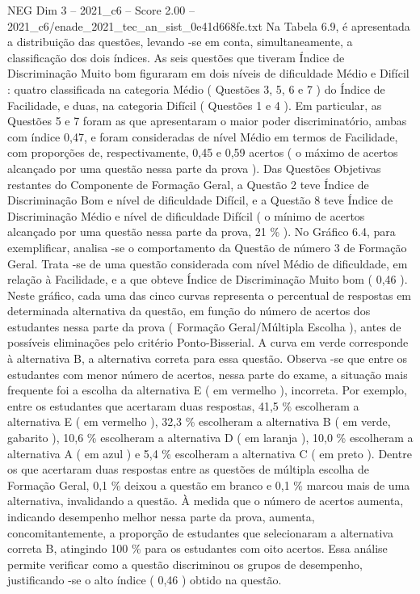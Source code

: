 \begin{textsample}{NEG Dim 3 – 2021\_c6 – Score 2.00 – 2021\_c6/enade\_2021\_tec\_an\_sist\_0e41d668fe.txt}
Na Tabela 6.9, é apresentada a distribuição das questões, levando -se em conta, simultaneamente, a classificação dos dois índices.
As seis questões que tiveram Índice de Discriminação Muito bom figuraram em dois níveis de dificuldade Médio e Difícil : quatro classificada na categoria Médio ( Questões 3, 5, 6 e 7 ) do Índice de Facilidade, e duas, na categoria Difícil ( Questões 1 e 4 ).
Em particular, as Questões 5 e 7 foram as que apresentaram o maior poder discriminatório, ambas com índice 0,47, e foram consideradas de nível Médio em termos de Facilidade, com proporções de, respectivamente, 0,45 e 0,59 acertos ( o máximo de acertos alcançado por uma questão nessa parte da prova ).
Das Questões Objetivas restantes do Componente de Formação Geral, a Questão 2 teve Índice de Discriminação Bom e nível de dificuldade Difícil, e a Questão 8 teve Índice de Discriminação Médio e nível de dificuldade Difícil ( o mínimo de acertos alcançado por uma questão nessa parte da prova, 21 \% ).
No Gráfico 6.4, para exemplificar, analisa -se o comportamento da Questão de número 3 de Formação Geral.
Trata -se de uma questão considerada com nível Médio de dificuldade, em relação à Facilidade, e a que obteve Índice de Discriminação Muito bom ( 0,46 ).
Neste gráfico, cada uma das cinco curvas representa o percentual de respostas em determinada alternativa da questão, em função do número de acertos dos estudantes nessa parte da prova ( Formação Geral/Múltipla Escolha ), antes de possíveis eliminações pelo critério Ponto-Bisserial.
A curva em verde corresponde à alternativa B, a alternativa correta para essa questão.
Observa -se que entre os estudantes com menor número de acertos, nessa parte do exame, a situação mais frequente foi a escolha da alternativa E ( em vermelho ), incorreta.
Por exemplo, entre os estudantes que acertaram duas respostas, 41,5 \% escolheram a alternativa E ( em vermelho ), 32,3 \% escolheram a alternativa B ( em verde, gabarito ), 10,6 \% escolheram a alternativa D ( em laranja ), 10,0 \% escolheram a alternativa A ( em azul ) e 5,4 \% escolheram a alternativa C ( em preto ).
Dentre os que acertaram duas respostas entre as questões de múltipla escolha de Formação Geral, 0,1 \% deixou a questão em branco e 0,1 \% marcou mais de uma alternativa, invalidando a questão.
À medida que o número de acertos aumenta, indicando desempenho melhor nessa parte da prova, aumenta, concomitantemente, a proporção de estudantes que selecionaram a alternativa correta B, atingindo 100 \% para os estudantes com oito acertos.
Essa análise permite verificar como a questão discriminou os grupos de desempenho, justificando -se o alto índice ( 0,46 ) obtido na questão.

\end{textsample}
